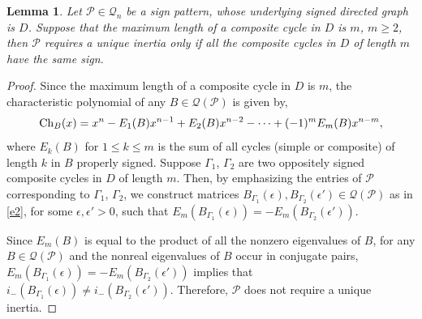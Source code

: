 \documentclass[a4paper, 10pt]{article}
\newtheorem{lemma}{Lemma}[section]
\numberwithin{equation}{section}
\def\Ch{{\rm Ch}}
\begin{document}
	\begin{lemma}\label{xnl1}
		Let $\mathcal{P}\in \mathcal{Q}_n$ be a sign pattern, whose underlying signed directed graph is $D$. Suppose that the maximum length of a composite cycle in $D$ is $m$, $m\geq 2$, then $\mathcal{P}$ requires a unique inertia only if all the composite cycles in $D$ of length $m$ have the same sign.
	\end{lemma}
	\begin{proof}
		Since the maximum length of a composite cycle in $D$ is $m$, the characteristic polynomial of any $B\in \mathcal{Q}(\mathcal{P})$ is given by, 
		$$\Ch_B(x)=x^n-E_1(B)x^{n-1}+E_2(B)x^{n-2}-\cdots+(-1)^mE_m(B)x^{n-m},$$
		where $E_k(B)$ for $1\leq k\leq m$ is the sum of all cycles (simple or composite) of length $k$ in $B$ properly signed. Suppose $\Gamma_1$, $\Gamma_2$ are two oppositely signed composite cycles in $D$ of length $m$. Then, by emphasizing the entries of $\mathcal{P}$ corresponding to $\Gamma_1$, $\Gamma_2$, we construct matrices $B_{\Gamma_1}(\epsilon), B_{\Gamma_2}(\epsilon') \in \mathcal{Q}(\mathcal{P})$ as in \ref{e2}, for some $\epsilon, \epsilon'>0$, such that $E_m(B_{\Gamma_1}(\epsilon))=-E_m(B_{\Gamma_2}(\epsilon'))$.
		
		Since $E_m(B)$ is equal to the product of all the nonzero eigenvalues of $B$, for any $B\in \mathcal{Q}(\mathcal{P})$ and the nonreal eigenvalues of $B$ occur in conjugate pairs, $E_m(B_{\Gamma_1}(\epsilon))=-E_m(B_{\Gamma_2}(\epsilon'))$ implies that $i_-(B_{\Gamma_1}(\epsilon))\neq i_-(B_{\Gamma_2}(\epsilon'))$. Therefore, $\mathcal{P}$ does not require a unique inertia.
	\end{proof}
	
\end{document}

